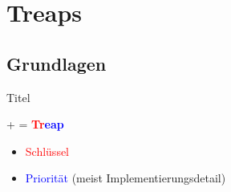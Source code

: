 \documentclass[t]{beamer}
\theoremstyle{plain}
\begin{document}
\section{Treaps}
\subsection{Grundlagen}
\begin{frame}{Titel}
    \begin{center}
         +  = \textbf{\textcolor{red}{Tr}\textcolor{blue}{eap}}
    \end{center}
    \begin{itemize}
        \item<2-> \textcolor{red}{Schlüssel}
        \item<3-> \textcolor{blue}{Priorität} (meist Implementierungsdetail)
    \end{itemize}
    \vspace{1em}
    \hfill{}
\end{frame}
\end{document}
